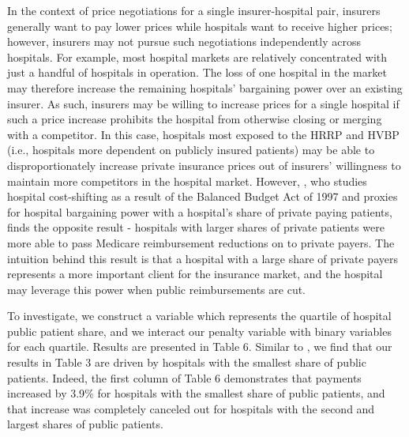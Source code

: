 \documentclass[12pt]{article}
\begin{document}
In the context of price negotiations for a single insurer-hospital pair, insurers generally want to pay lower prices while hospitals want to receive higher prices; however, insurers may not pursue such negotiations independently across hospitals. For example, most hospital markets are relatively concentrated with just a handful of hospitals in operation. The loss of one hospital in the market may therefore increase the remaining hospitals' bargaining power over an existing insurer. As such, insurers may be willing to increase prices for a single hospital if such a price increase prohibits the hospital from otherwise closing or merging with a competitor. In this case, hospitals most exposed to the HRRP and HVBP (i.e., hospitals more dependent on publicly insured patients) may be able to disproportionately increase private insurance prices out of insurers' willingness to maintain more competitors in the hospital market.  However, \citet{wu2010}, who studies hospital cost-shifting as a result of the Balanced Budget Act of 1997 and proxies for hospital bargaining power with a hospital's share of private paying patients, finds the opposite result - hospitals with larger shares of private patients were more able to pass Medicare reimbursement reductions on to private payers.  The intuition behind this result is that a hospital with a large share of private payers represents a more important client for the insurance market, and the hospital may leverage this power when public reimbursements are cut.  

To investigate, we construct a variable which represents the quartile of hospital public patient share, and we interact our penalty variable with binary variables for each quartile.  Results are presented in Table 6.  Similar to \citet{wu2010}, we find that our results in Table 3 are driven by hospitals with the smallest share of public patients.  Indeed, the first column of Table 6 demonstrates that payments increased by 3.9$\%$ for hospitals with the smallest share of public patients, and that increase was completely canceled out for hospitals with the second and largest shares of public patients.  
\end{document}

